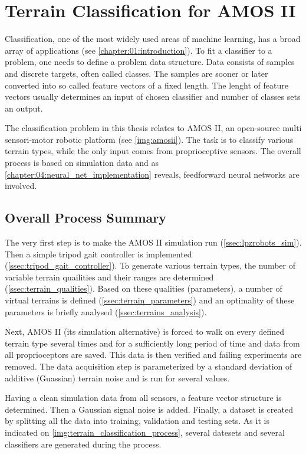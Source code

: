 \chapter{Terrain Classification for AMOS II} \label{chapter:05:terrain_classification}
Classification, one of the most widely used areas of machine learning, has a broad array of applications (see \cref{chapter:01:introduction}). To fit a classifier to a problem, one needs to define a problem data structure. Data consists of samples and discrete targets, often called classes. The samples are sooner or later converted into so called feature vectors of a fixed length. The lenght of feature vectors usually determines an input of chosen classifier and number of classes sets an output.

The classification problem in this thesis relates to AMOS II, an open-source multi sensori-motor robotic platform (see \cref{img:amosii}). The task is to classify various terrain types, while the only input comes from proprioceptive sensors. The overall process is based on simulation data and as \cref{chapter:04:neural_net_implementation} reveals, feedforward neural networks are involved.

\section{Overall Process Summary} \label{sec:overall_process_summary}
The very first step is to make the AMOS II simulation run (\cref{ssec:lpzrobots_sim}). Then a simple tripod gait controller is implemented (\cref{ssec:tripod_gait_controller}). To generate various terrain types, the number of variable terrain quailities and their ranges are determined (\cref{ssec:terrain_qualities}). Based on these qualities (parameters), a number of virtual terrains is defined (\cref{ssec:terrain_parameters}) and an optimality of these parameters is briefly analysed (\cref{ssec:terrains_analysis}).

Next, AMOS II (its simulation alternative) is forced to walk on every defined terrain type several times and for a sufficiently long period of time and data from all proprioceptors are saved. This data is then verified and failing experiments are removed. The data acquisition step is parameterized by a standard deviation of additive (Guassian) terrain noise and is run for several values.

Having a clean simulation data from all sensors, a feature vector structure is determined. Then a Gaussian signal noise is added. Finally, a dataset is created by splitting all the data into training, validation and testing sets. As it is indicated on \cref{img:terrain_classification_process}, several datesets and several classifiers are generated during the process. 

